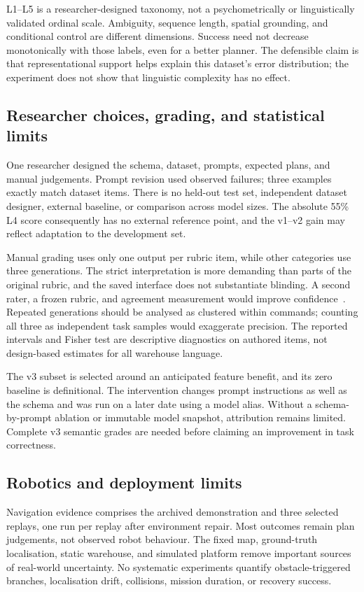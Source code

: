 \documentclass[journal]{IEEEtran}
\begin{document}
L1--L5 is a researcher-designed taxonomy, not a psychometrically or linguistically validated ordinal scale. Ambiguity, sequence length, spatial grounding, and conditional control are different dimensions. Success need not decrease monotonically with those labels, even for a better planner. The defensible claim is that representational support helps explain this dataset's error distribution; the experiment does not show that linguistic complexity has no effect.

\subsection{Researcher choices, grading, and statistical limits}
One researcher designed the schema, dataset, prompts, expected plans, and manual judgements. Prompt revision used observed failures; three examples exactly match dataset items. There is no held-out test set, independent dataset designer, external baseline, or comparison across model sizes. The absolute 55\% L4 score consequently has no external reference point, and the v1--v2 gain may reflect adaptation to the development set.

Manual grading uses only one output per rubric item, while other categories use three generations. The strict interpretation is more demanding than parts of the original rubric, and the saved interface does not substantiate blinding. A second rater, a frozen rubric, and agreement measurement would improve confidence~\cite{artstein2008agreement}. Repeated generations should be analysed as clustered within commands; counting all three as independent task samples would exaggerate precision. The reported intervals and Fisher test are descriptive diagnostics on authored items, not design-based estimates for all warehouse language.

The v3 subset is selected around an anticipated feature benefit, and its zero baseline is definitional. The intervention changes prompt instructions as well as the schema and was run on a later date using a model alias. Without a schema-by-prompt ablation or immutable model snapshot, attribution remains limited. Complete v3 semantic grades are needed before claiming an improvement in task correctness.

\subsection{Robotics and deployment limits}
Navigation evidence comprises the archived demonstration and three selected replays, one run per replay after environment repair. Most outcomes remain plan judgements, not observed robot behaviour. The fixed map, ground-truth localisation, static warehouse, and simulated platform remove important sources of real-world uncertainty. No systematic experiments quantify obstacle-triggered branches, localisation drift, collisions, mission duration, or recovery success.
\end{document}
